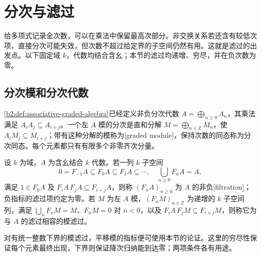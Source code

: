 
\section{分次与滤过}
\label{b2:sec:2001}

给多项式记录全次数，可以在乘法中保留最高次部分。非交换关系若还含有较低次项，直接分次可能失效，但次数不超过给定界的子空间仍然有用。这就是滤过的出发点。以下固定域 \(k\)，代数均结合含幺；本节的滤过均递增、穷尽，并在负次数为零。

%
%

\subsection{分次模和分次代数}
\label{b2:subsec:2001:01}

\cref{b2:def:associative-graded-algebra}已经定义非负分次代数 \(A=\bigoplus_{n\ge0}A_n\)，其乘法满足 \(A_iA_j\subseteq A_{i+j}\)。一个左 \(A\) 模的分次是直和分解 \(M=\bigoplus_{n\in\mathbb Z}M_n\)，使 \(A_iM_j\subseteq M_{i+j}\)；带有这种分解的模称为[graded module]，保持次数的同态称为分次同态。每个元素都只有有限多个非零齐次分量。

\begin{definition}\label{b2:def:filtered-algebra-module}
	设 \(k\) 为域，\(A\) 为含幺结合 \(k\) 代数。若一列 \(k\) 子空间
	\[
		0=F_{-1}A\subseteq F_0A\subseteq F_1A\subseteq\cdots, \quad \bigcup_{n\ge0}F_nA=A,
	\]
	满足 \(1\in F_0A\) 及 \(F_iA\,F_jA\subseteq F_{i+j}A\)，则称 \((F_nA)_{n\geq0}\) 为 \(A\) 的非负[filtration]；负指标的滤过项约定为零。若 \(M\) 为左 \(A\) 模，\((F_nM)_{n\in\mathbb Z}\) 为递增的 \(k\) 子空间列，满足 \(\bigcup_nF_nM=M\)、\(F_nM=0\) 对 \(n<0\)，以及 \(F_iA\,F_jM\subseteq F_{i+j}M\)，则称它为与 \(A\) 的滤过相容的模滤过。
\end{definition}

对有统一整数下界的模滤过，平移模的指标便可使用本节的论证。这里的穷尽性保证每个元素最终出现，下界则保证降次归纳能到达零；两项条件各有用途。

